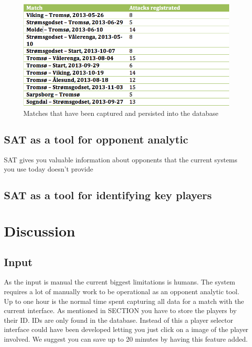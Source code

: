 \begin{figure}[ht!]
\centering
\includegraphics[width=1\textwidth]{images/general/matched_regged.png}
\caption{Matches that have been captured and persisted into the database}
\label{fig:matches_regged}
\end{figure}

\subsection{SAT as a tool for opponent analytic}


SAT gives you valuable information about opponents that the current systems you use today doesn't provide


\subsection{SAT as a tool for identifying key players}

\section{Discussion}
\subsection{Input}

As the input is manual the current biggest limitations is humans. The system requires a lot of manually work to be operational as an opponent analytic tool. Up to one hour is the normal time spent capturing all data for a match with the current interface. As mentioned in SECTION you have to store the players by their ID. IDs are only found in the database. Instead of this a player selector interface could have been developed letting you just click on a image of the player involved. We suggest you can save up to 20 minutes by having this feature added.

